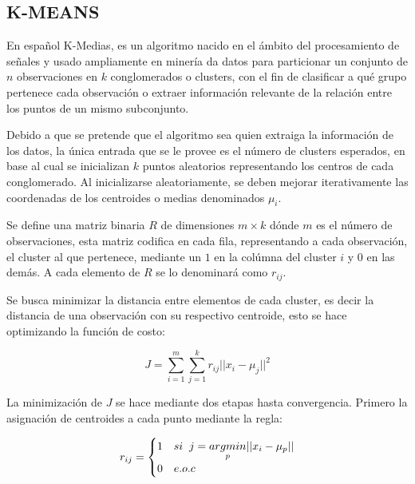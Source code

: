         \subsection{K-MEANS}
        	En español K-Medias, es un algoritmo nacido en el ámbito del procesamiento de señales y usado ampliamente en minería da datos para particionar un conjunto de $n$ observaciones en $k$ conglomerados o clusters, con el fin de clasificar a qué grupo pertenece cada observación o extraer información relevante de la relación entre los puntos de un mismo subconjunto.
        	
        	Debido a que se pretende que el algoritmo sea quien extraiga la información de los datos, la única entrada que se le provee es el número de clusters esperados, en base al cual se inicializan $k$ puntos aleatorios representando los centros de cada conglomerado. Al inicializarse aleatoriamente, se deben mejorar iterativamente las coordenadas de los centroides o medias denominados $\mu_i$.
        	
        	Se define una matriz binaria $R$ de dimensiones $m\times k$ dónde $m$ es el número de observaciones, esta matriz codifica en cada fila, representando a cada observación, el cluster al que pertenece, mediante un $1$ en la colúmna del cluster $i$ y $0$ en las demás. A cada elemento de $R$ se lo denominará como $r_{ij}$.
        	
        	Se busca minimizar la distancia entre elementos de cada cluster, es decir la distancia de una observación con su respectivo centroide, esto se hace optimizando la función de costo:
        	
        	\begin{equation}
        		J = \sum_{i=1}^m\sum_{j=1}^k r_{ij}||x_i - \mu_j||^2
        	\end{equation}
        	
        	La minimización de $J$ se hace mediante dos etapas hasta convergencia. Primero la asignación de centroides a cada punto mediante la regla:
        	
        	\begin{equation}
        		r_{ij} = 
        		\begin{cases}
        			1 & si\hspace{2mm}j = \underset{p}{argmin}||x_i - \mu_p||\\
        			0 & e.o.c
        		\end{cases}
        	\end{equation}
        
